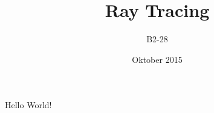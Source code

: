 \documentclass{article}
\title{Ray Tracing}
\author{B2-28}
\date{Oktober 2015}
\begin{document}
    \maketitle
        Hello World!
\end{document}
